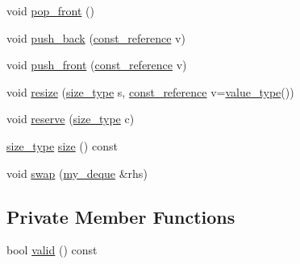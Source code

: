 \begin{DoxyCompactItemize}
\item 
void \hyperlink{classmy__deque_a85c322cdc4f629e44abdcf369fdd3dab}{pop\-\_\-front} ()
\item 
void \hyperlink{classmy__deque_a15867a8b57c321dcc8ebb4cfa785d7ca}{push\-\_\-back} (\hyperlink{classmy__deque_ad50d8b378580088cf77fa43f0640e49c}{const\-\_\-reference} v)
\item 
void \hyperlink{classmy__deque_af8d66a7ed1fd51476ec785228ac76996}{push\-\_\-front} (\hyperlink{classmy__deque_ad50d8b378580088cf77fa43f0640e49c}{const\-\_\-reference} v)
\item 
void \hyperlink{classmy__deque_a80369f549dcd0a2ea9bc086fc97c8e25}{resize} (\hyperlink{classmy__deque_a61e5e5317fe72a381ce4d45f09544b02}{size\-\_\-type} s, \hyperlink{classmy__deque_ad50d8b378580088cf77fa43f0640e49c}{const\-\_\-reference} v=\hyperlink{classmy__deque_ae9c156c405acc57623a4601ce755596f}{value\-\_\-type}())
\item 
void \hyperlink{classmy__deque_ae9b535414a0575bc30f8a90b894adfac}{reserve} (\hyperlink{classmy__deque_a61e5e5317fe72a381ce4d45f09544b02}{size\-\_\-type} c)
\item 
\hyperlink{classmy__deque_a61e5e5317fe72a381ce4d45f09544b02}{size\-\_\-type} \hyperlink{classmy__deque_a3100498f22d2dfa480b141f8ef7990ca}{size} () const 
\item 
void \hyperlink{classmy__deque_a22e1c253ac010e4327c87293b6cfbe5c}{swap} (\hyperlink{classmy__deque}{my\-\_\-deque} \&rhs)
\end{DoxyCompactItemize}
\subsection*{Private Member Functions}
\begin{DoxyCompactItemize}
\item 
bool \hyperlink{classmy__deque_ac48856ffa58fe0d4d21852c503d7ff73}{valid} () const 
\end{DoxyCompactItemize}
